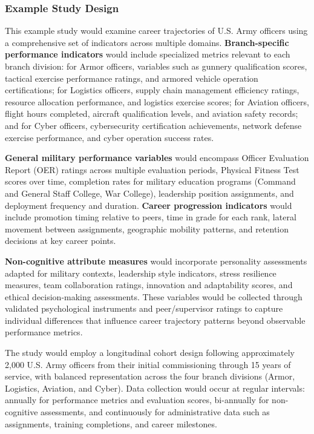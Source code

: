\documentclass[main.tex]{subfiles}
\begin{document}
\subsubsection{Example Study Design}


This example study would examine career trajectories of U.S. Army officers using a comprehensive set of indicators across multiple domains. \textbf{Branch-specific performance indicators} would include specialized metrics relevant to each branch division: for Armor officers, variables such as gunnery qualification scores, tactical exercise performance ratings, and armored vehicle operation certifications; for Logistics officers, supply chain management efficiency ratings, resource allocation performance, and logistics exercise scores; for Aviation officers, flight hours completed, aircraft qualification levels, and aviation safety records; and for Cyber officers, cybersecurity certification achievements, network defense exercise performance, and cyber operation success rates.

\textbf{General military performance variables} would encompass Officer Evaluation Report (OER) ratings across multiple evaluation periods, Physical Fitness Test scores over time, completion rates for military education programs (Command and General Staff College, War College), leadership position assignments, and deployment frequency and duration. \textbf{Career progression indicators} would include promotion timing relative to peers, time in grade for each rank, lateral movement between assignments, geographic mobility patterns, and retention decisions at key career points.

\textbf{Non-cognitive attribute measures} would incorporate personality assessments adapted for military contexts, leadership style indicators, stress resilience measures, team collaboration ratings, innovation and adaptability scores, and ethical decision-making assessments. These variables would be collected through validated psychological instruments and peer/supervisor ratings to capture individual differences that influence career trajectory patterns beyond observable performance metrics.


The study would employ a longitudinal cohort design following approximately 2,000 U.S. Army officers from their initial commissioning through 15 years of service, with balanced representation across the four branch divisions (Armor, Logistics, Aviation, and Cyber). Data collection would occur at regular intervals: annually for performance metrics and evaluation scores, bi-annually for non-cognitive assessments, and continuously for administrative data such as assignments, training completions, and career milestones.
\end{document}
